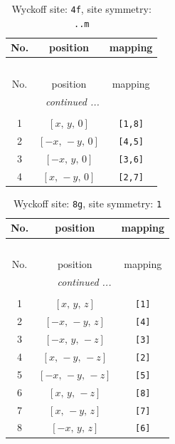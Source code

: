 \documentclass[fleqn,8pt]{jsarticle}
\begin{document}
\begin{longtable}{ccc}
\caption{Wyckoff site: {\tt 4f}, site symmetry: {\tt ..m}}
 \\
 \hline \hline
No. & position & mapping \\ \hline \endfirsthead

\multicolumn{2}{l}{\tablename\ \thetable{}} \\
 \hline \hline
No. & position & mapping \\ \hline \endhead

 \hline \hline
\multicolumn{2}{r}{\footnotesize\it continued ...} \\ \endfoot

 \hline \hline
\multicolumn{2}{r}{} \\ \endlastfoot

1 & $\left[ x,\, y,\, 0 \right]$ & {\tt [1,8]} \\ \hline
2 & $\left[ - x,\, - y,\, 0 \right]$ & {\tt [4,5]} \\ \hline
3 & $\left[ - x,\, y,\, 0 \right]$ & {\tt [3,6]} \\ \hline
4 & $\left[ x,\, - y,\, 0 \right]$ & {\tt [2,7]} \\
\end{longtable}
\renewcommand{\arraystretch}{1.2}
\begin{longtable}{ccc}
\caption{Wyckoff site: {\tt 8g}, site symmetry: {\tt 1}}
 \\
 \hline \hline
No. & position & mapping \\ \hline \endfirsthead

\multicolumn{2}{l}{\tablename\ \thetable{}} \\
 \hline \hline
No. & position & mapping \\ \hline \endhead

 \hline \hline
\multicolumn{2}{r}{\footnotesize\it continued ...} \\ \endfoot

 \hline \hline
\multicolumn{2}{r}{} \\ \endlastfoot

1 & $\left[ x,\, y,\, z \right]$ & {\tt [1]} \\ \hline
2 & $\left[ - x,\, - y,\, z \right]$ & {\tt [4]} \\ \hline
3 & $\left[ - x,\, y,\, - z \right]$ & {\tt [3]} \\ \hline
4 & $\left[ x,\, - y,\, - z \right]$ & {\tt [2]} \\ \hline
5 & $\left[ - x,\, - y,\, - z \right]$ & {\tt [5]} \\ \hline
6 & $\left[ x,\, y,\, - z \right]$ & {\tt [8]} \\ \hline
7 & $\left[ x,\, - y,\, z \right]$ & {\tt [7]} \\ \hline
8 & $\left[ - x,\, y,\, z \right]$ & {\tt [6]} \\
\end{longtable}
\end{document}
